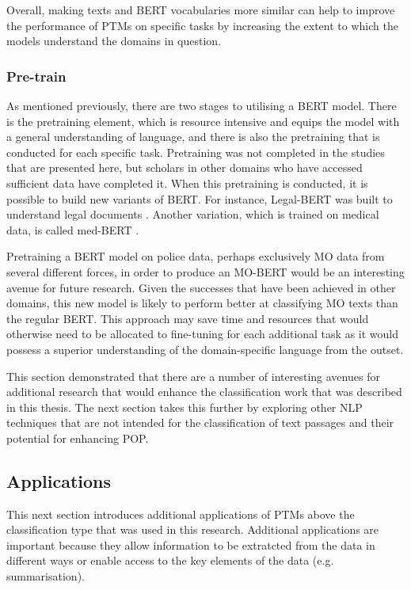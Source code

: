 Overall, making texts and BERT vocabularies more similar can help to improve the performance of PTMs on specific tasks by increasing the extent to which the models understand the domains in question.

\subsubsection{Pre-train} As mentioned previously, there are two stages to utilising a BERT model. There is the pretraining element, which is resource intensive and equips the model with a general understanding of language, and there is also the pretraining that is conducted for each specific task. Pretraining was not completed in the studies that are presented here, but scholars in other domains who have accessed sufficient data have completed it. When this pretraining is conducted, it is possible to build new variants of BERT. For instance, Legal-BERT was built to understand legal documents \parencite{legal_bert}. Another variation, which is trained on medical data, is called med-BERT \parencite{med_bert}.

Pretraining a BERT model on police data, perhaps exclusively MO data from several different forces, in order to produce an MO-BERT would be an interesting avenue for future research. Given the successes that have been achieved in other domains, this new model is likely to perform better at classifying MO texts than the regular BERT. This approach may save time and resources that would otherwise need to be allocated to fine-tuning for each additional task as it would possess a superior understanding of the domain-specific language from the outset.

This section demonstrated that there are a number of interesting avenues for additional research that would enhance the classification work that was described in this thesis. The next section takes this further by exploring other NLP techniques that are not intended for the classification of text passages and their potential for enhancing POP.

\subsection{Applications} This next section introduces additional applications of PTMs above the classification type that was used in this research. Additional applications are important because they allow information to be extratcted from the data in different ways or enable access to the key elements of the data (e.g. summarisation).

